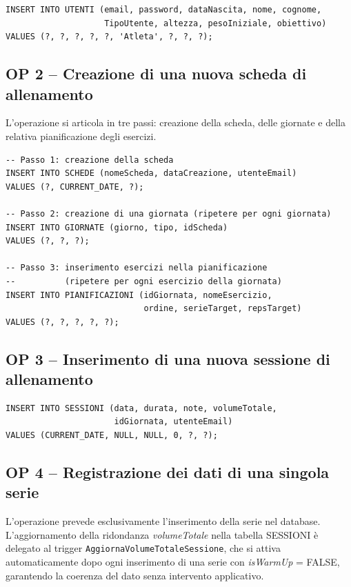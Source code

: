 \documentclass[12pt]{report}
\begin{document}
\begin{lstlisting}[style=sql]
INSERT INTO UTENTI (email, password, dataNascita, nome, cognome,
                    TipoUtente, altezza, pesoIniziale, obiettivo)
VALUES (?, ?, ?, ?, ?, 'Atleta', ?, ?, ?);
\end{lstlisting}

\subsection*{OP 2 – Creazione di una nuova scheda di allenamento}

L'operazione si articola in tre passi: creazione della scheda,
delle giornate e della relativa pianificazione degli esercizi.

\begin{lstlisting}[style=sql]
-- Passo 1: creazione della scheda
INSERT INTO SCHEDE (nomeScheda, dataCreazione, utenteEmail)
VALUES (?, CURRENT_DATE, ?);

-- Passo 2: creazione di una giornata (ripetere per ogni giornata)
INSERT INTO GIORNATE (giorno, tipo, idScheda)
VALUES (?, ?, ?);

-- Passo 3: inserimento esercizi nella pianificazione
--          (ripetere per ogni esercizio della giornata)
INSERT INTO PIANIFICAZIONI (idGiornata, nomeEsercizio,
                            ordine, serieTarget, repsTarget)
VALUES (?, ?, ?, ?, ?);
\end{lstlisting}

\subsection*{OP 3 – Inserimento di una nuova sessione di allenamento}

\begin{lstlisting}[style=sql]
INSERT INTO SESSIONI (data, durata, note, volumeTotale,
                      idGiornata, utenteEmail)
VALUES (CURRENT_DATE, NULL, NULL, 0, ?, ?);
\end{lstlisting}

\subsection*{OP 4 – Registrazione dei dati di una singola serie}

L'operazione prevede esclusivamente l'inserimento della serie nel
database. L'aggiornamento della ridondanza \textit{volumeTotale}
nella tabella SESSIONI è delegato al trigger
\texttt{AggiornaVolumeTotaleSessione}, che si attiva automaticamente
dopo ogni inserimento di una serie con \textit{isWarmUp} = FALSE,
garantendo la coerenza del dato senza intervento applicativo.
\end{document}
